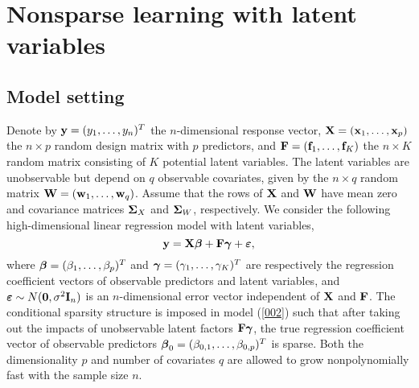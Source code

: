 \documentclass{statsoc}
\newcommand{\bff}{\mbox{\bf f}}
\newcommand{\bw}{\mbox{\bf w}}
\newcommand{\bx}{\mbox{\bf x}}
\newcommand{\by}{\mbox{\bf y}}
\newcommand{\bF}{\mbox{\bf F}}
\newcommand{\bI}{\mbox{\bf I}}
\newcommand{\bW}{\mbox{\bf W}}
\newcommand{\bX}{\mbox{\bf X}}
\newcommand{\bzero}{\mbox{\bf 0}}
\newcommand{\bveps}{\mbox{\boldmath $\varepsilon$}}
\newcommand{\bbeta}{\mbox{\boldmath $\beta$}}
\newcommand{\bgamma}{\mbox{\boldmath $\gamma$}}
\newcommand{\bSig}{\mbox{\boldmath $\Sigma$}}
\def\t{^T}
\begin{document}

\section{Nonsparse learning with latent variables} \label{Sec2}

\subsection{Model setting}

Denote by $\by = (y_1, \dots, y_n)\t$ the $n$-dimensional response vector, $\bX = (\bx_1, \dots, \bx_p)$ the $n \times p$ random design matrix with $p$ predictors, and $\bF = (\bff_1, \dots, \bff_K)$ the $n \times K$ random matrix consisting of $K$ potential latent variables. The latent variables are unobservable but depend on $q$ observable covariates, given by the $n \times q$ random matrix $\bW = (\bw_1, \dots, \bw_q)$. Assume that the rows of $\bX$ and $\bW$ have mean zero and covariance matrices $\bSig_{X}$ and $\bSig_W$, respectively. We consider the following high-dimensional linear regression model with latent variables,
\begin{equation} \label{002}
\by = \bX \bbeta + \bF \bgamma + \bveps,
\end{equation}
where $\bbeta = (\beta_1, \dots, \beta_p)\t$ and $\bgamma = (\gamma_1, \dots, \gamma_K)\t$ are respectively the regression coefficient vectors of observable predictors and latent variables, and $\bveps \sim N(\bzero, \sigma^2 \bI_n)$ is an $n$-dimensional error vector independent of $\bX$ and $\bF$. The conditional sparsity structure is imposed in model (\ref{002}) such that after taking out the impacts of unobservable latent factors $\bF \bgamma$, the true regression coefficient vector of observable predictors $\bbeta_0 = (\beta_{0,1}, \dots, \beta_{0,p})\t$ is sparse. Both the dimensionality $p$ and number of covariates $q$ are allowed to grow nonpolynomially fast with the sample size $n$.
\end{document}
